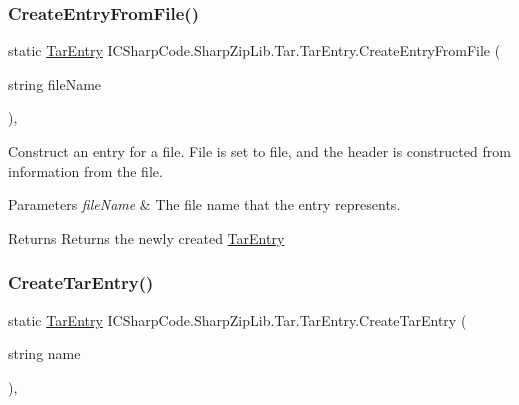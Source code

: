 \subsubsection{\texorpdfstring{Create\+Entry\+From\+File()}{CreateEntryFromFile()}}
{\footnotesize\ttfamily static \hyperlink{class_i_c_sharp_code_1_1_sharp_zip_lib_1_1_tar_1_1_tar_entry}{Tar\+Entry} I\+C\+Sharp\+Code.\+Sharp\+Zip\+Lib.\+Tar.\+Tar\+Entry.\+Create\+Entry\+From\+File (\begin{DoxyParamCaption}\item[{string}]{file\+Name }\end{DoxyParamCaption})\hspace{0.3cm}{\ttfamily [inline]}, {\ttfamily [static]}}



Construct an entry for a file. File is set to file, and the header is constructed from information from the file. 


\begin{DoxyParams}{Parameters}
{\em file\+Name} & The file name that the entry represents.\\
\hline
\end{DoxyParams}
\begin{DoxyReturn}{Returns}
Returns the newly created \hyperlink{class_i_c_sharp_code_1_1_sharp_zip_lib_1_1_tar_1_1_tar_entry}{Tar\+Entry}
\end{DoxyReturn}
\mbox{\label{class_i_c_sharp_code_1_1_sharp_zip_lib_1_1_tar_1_1_tar_entry_a4962c5257d935ff3c2aa355b35eb4302}} 
\subsubsection{\texorpdfstring{Create\+Tar\+Entry()}{CreateTarEntry()}}
{\footnotesize\ttfamily static \hyperlink{class_i_c_sharp_code_1_1_sharp_zip_lib_1_1_tar_1_1_tar_entry}{Tar\+Entry} I\+C\+Sharp\+Code.\+Sharp\+Zip\+Lib.\+Tar.\+Tar\+Entry.\+Create\+Tar\+Entry (\begin{DoxyParamCaption}\item[{string}]{name }\end{DoxyParamCaption})\hspace{0.3cm}{\ttfamily [inline]}, {\ttfamily [static]}}



